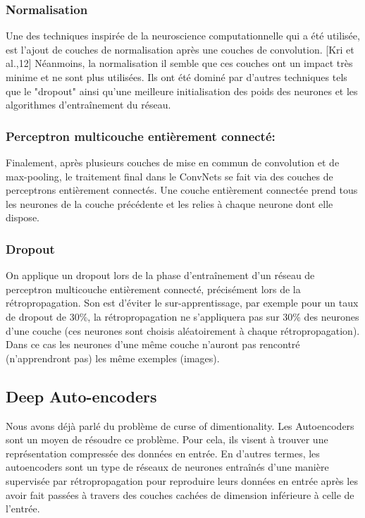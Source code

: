 \subsubsection{Normalisation}
Une des techniques inspirée de la neuroscience computationnelle qui a été utilisée, est l'ajout de couches de normalisation après une couches de convolution. [Kri et al.,12] Néanmoins, la normalisation il semble que ces couches ont un impact très minime et ne sont plus utilisées. Ils ont été dominé par d'autres techniques tels que le "dropout" ainsi qu'une meilleure initialisation des poids des neurones et les algorithmes d'entraînement du réseau.

\subsubsection{Perceptron multicouche entièrement connecté:}

Finalement, après plusieurs couches de mise en commun de convolution et de max-pooling, le traitement final dans le ConvNets se fait via des couches de perceptrons entièrement connectés. Une couche entièrement connectée prend tous les neurones de la couche précédente et les relies à chaque neurone dont elle dispose.

\subsubsection{Dropout}
On applique un dropout lors de la phase d'entraînement d'un réseau de perceptron  multicouche entièrement connecté, précisément lors de la rétropropagation. Son est d'éviter le sur-apprentissage, par exemple pour un taux de dropout de 30\%, la rétropropagation ne s'appliquera pas sur 30\% des neurones d'une couche (ces neurones sont choisis aléatoirement à chaque rétropropagation). Dans ce cas les neurones d'une même couche n'auront pas rencontré (n'apprendront pas) les même exemples (images).

\subsection{Deep Auto-encoders}

Nous avons déjà parlé du problème de curse of dimentionality. Les Autoencoders sont un moyen de résoudre ce problème. Pour cela, ils visent à trouver une représentation compressée des données en entrée.
En d'autres termes, les autoencoders sont un type de réseaux de neurones entraînés d'une manière supervisée par rétropropagation pour reproduire leurs données en entrée après les avoir fait passées à travers des couches cachées de dimension inférieure à celle de l'entrée.

